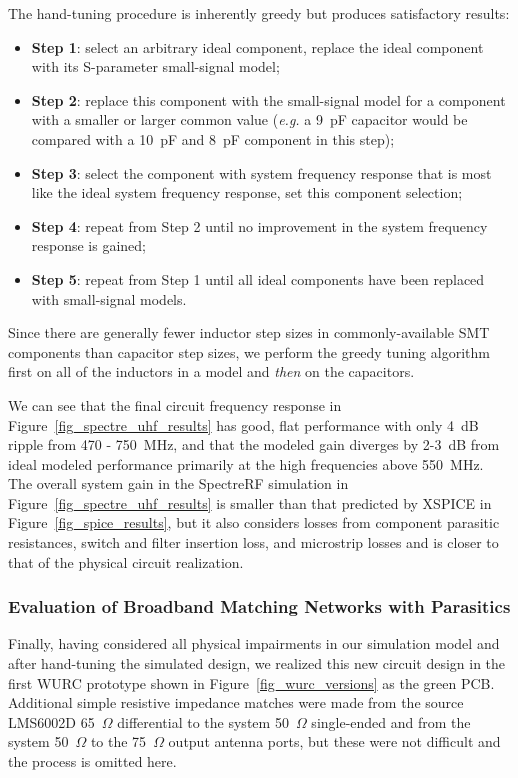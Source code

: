 	The hand-tuning procedure is inherently greedy but produces satisfactory results: 
	\begin{itemize}
		\item \textbf{Step 1}: select an arbitrary ideal component, replace the ideal component with its S-parameter small-signal model;
		\item \textbf{Step 2}: replace this component with the small-signal model for a component with a smaller or larger common value (\emph{e.g.} a 9~pF capacitor would be compared with a 10~pF and 8~pF component in this step);
		\item \textbf{Step 3}: select the component with system frequency response that is most like the ideal system frequency response, set this component selection;
		\item \textbf{Step 4}: repeat from Step 2 until no improvement in the system frequency response is gained;
		\item \textbf{Step 5}: repeat from Step 1 until all ideal components have been replaced with small-signal models.
	\end{itemize}
	
	Since there are generally fewer inductor step sizes in commonly-available \ac{SMT} components than capacitor step sizes, we perform the greedy tuning algorithm first on all of the inductors in a model and \emph{then} on the capacitors.
	
	We can see that the final circuit frequency response in Figure~\ref{fig_spectre_uhf_results} has good, flat performance with only 4~dB ripple from 470 - 750~MHz, and that the modeled gain diverges by 2-3~dB from ideal modeled performance primarily at the high frequencies above 550~MHz.
	The overall system gain in the SpectreRF simulation in Figure~\ref{fig_spectre_uhf_results} is smaller than that predicted by XSPICE in Figure~\ref{fig_spice_results}, but it also considers losses from component parasitic resistances, switch and filter insertion loss, and microstrip losses and is closer to that of the physical circuit realization.
	
\subsubsection{Evaluation of Broadband Matching Networks with Parasitics}
\label{sec_wurc_parasitic_eval}
	
	Finally, having considered all physical impairments in our simulation model and after hand-tuning the simulated design, we realized this new circuit design in the first \ac{WURC} prototype shown in Figure~\ref{fig_wurc_versions} as the green PCB.
	Additional simple resistive impedance matches were made from the source LMS6002D 65~$\Omega$ differential to the system 50~$\Omega$ single-ended and from the system 50~$\Omega$ to the 75~$\Omega$ output antenna ports, but these were not difficult and the process is omitted here.

